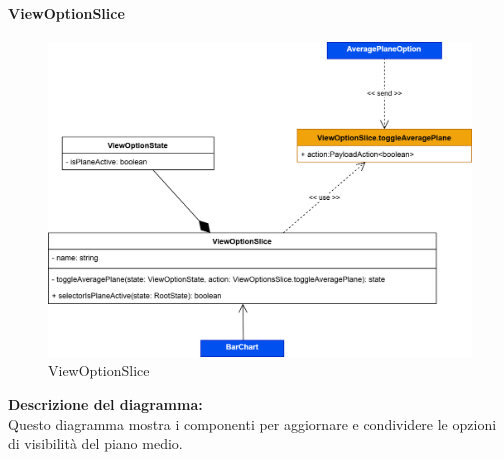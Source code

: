 \paragraph{ViewOptionSlice}
\begin{figure}[h!] \centering
      \includegraphics[scale=0.18]{template/images/uml_front/logic/ViewOptionSlice.png}
      \caption{ViewOptionSlice}
\end{figure}
\textbf{Descrizione del diagramma:}\\
Questo diagramma mostra i componenti per aggiornare e condividere le opzioni di visibilità del piano medio.
